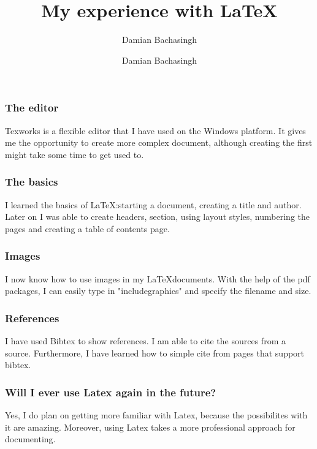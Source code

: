 \documentclass{beamer}
\author{Damian Bachasingh}
\title{My experience with \LaTeX }
\author{Damian Bachasingh}
\begin{document}
\frame{\titlepage}
\thispagestyle{empty}



\begin{frame}

\frametitle{The editor}
Texworks is a flexible editor that I have used on the Windows platform. It gives me the opportunity to create more complex document, although creating the first might take some time to get used to.
\end{frame}

\begin{frame}
\frametitle{The basics}
I learned the basics of LaTeX:starting a document, creating a title and author. Later on I was able to create headers, section, using layout styles, numbering the pages and creating a table of contents page.
\end{frame}

\begin{frame}
\frametitle{Images}
I now know how to use images in my \LaTeX documents. With the help of the pdf packages, I can easily type in "includegraphics" and specify the filename and size. 

\end{frame}

\begin{frame}
\frametitle{References}
 I have used Bibtex to show references. I am able to cite the sources from a source. Furthermore, I have learned how to simple cite from pages that support bibtex.
\end{frame}

\begin{frame}
\frametitle{Will I ever use Latex again in the future?}
 Yes, I do plan on getting more familiar with Latex, because the possibilites with it are amazing. Moreover, using Latex takes a more professional approach for documenting.
\end{frame}
\end{document}
